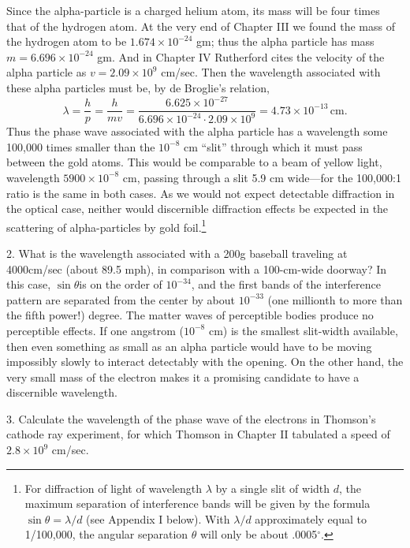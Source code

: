 Since the alpha-particle is a charged helium atom, its mass will be four
times that of the hydrogen atom. At the very end of Chapter III we found
the mass of the hydrogen atom to be $1.674\!\times\!10^{-24}$ gm;
thus the alpha particle has mass $m = 6.696\!\times\!10^{-24}$ gm. And in 
Chapter IV Rutherford cites the
velocity of the alpha particle as $v = 2.09\!\times\!10^{9}$ cm/sec. Then 
the wavelength associated with these
alpha particles must be, by de Broglie's relation,
\begin{equation*}
\lambda = \frac{h}{p} = \frac{h}{mv} = 
\frac{6.625\!\times\!10^{-27}}{6.696\!\times\!10^{-24}\cdot2.09\!\times\!10^9}
= 4.73\!\times\!10^{-13}\, \text{cm}.
\end{equation*}
Thus the phase wave associated with the alpha particle has a wavelength
some 100,000 times smaller than the $10^{-8}$ cm ``slit''
through which it must pass between the gold atoms. This would be
comparable to a beam of yellow light, wavelength $5900\!\times\!10^{-8}$ cm, passing
through a slit 5.9 cm wide---for the 100,000:1 ratio is the same in both
cases. As we would not expect detectable diffraction in the optical
case, neither would discernible diffraction effects be expected in the
scattering of alpha-particles by gold foil.\footnote{For diffraction of
  light of wavelength $\lambda$ by a single slit of width $d$, the
  maximum separation of interference bands will be given by the formula
  $\sin{\theta} = \lambda/d$ (see Appendix I below). With
  $\lambda/d$ approximately equal to 1/100,000, the angular
  separation $\theta$ will only be about .0005$^{\circ}$.}

2. What is the wavelength associated with a 200g baseball traveling at
4000cm/sec (about 89.5 mph), in comparison with a 100-cm-wide doorway?
In this case, $\sin{\theta}$is on the order of $10^{-34}$,
and the first bands of the interference pattern are separated from the
center by about $10^{-33}$ (one millionth to more than the
fifth power!) degree. The matter waves of perceptible bodies produce no
perceptible effects. If one angstrom ($10^{-8}$ cm) is the
smallest slit-width available, then even something as small as an alpha
particle would have to be moving impossibly slowly to interact
detectably with the opening. On the other hand, the very small mass of
the electron makes it a promising candidate to have a discernible
wavelength.

3. Calculate the wavelength of the phase wave of the electrons in
Thomson's cathode ray experiment, for which Thomson in Chapter II
tabulated a speed of $2.8\!\times\!10^{9}$ cm/sec.

